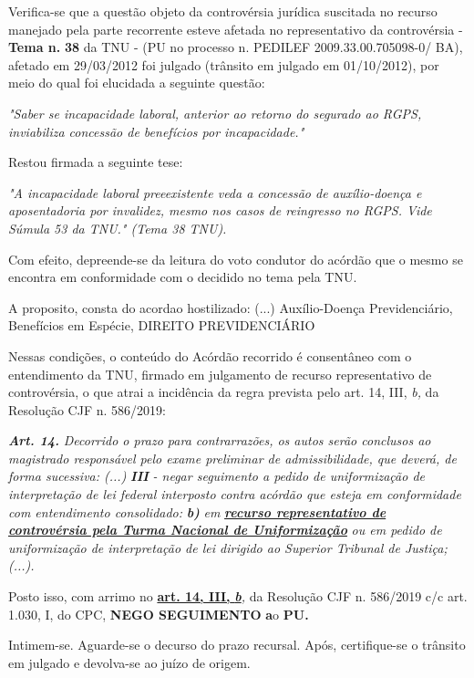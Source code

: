 \documentclass[12pt]{article}
\begin{document}
\justifying
\noindent Verifica-se que a questão objeto da controvérsia jurídica suscitada no recurso manejado pela parte recorrente esteve afetada no representativo da controvérsia - \textbf{Tema n. }\textbf{38} da TNU - (PU no processo n. PEDILEF 2009.33.00.705098-0/ BA),  afetado em 29/03/2012 foi julgado (trânsito em julgado em 01/10/2012), por meio do qual foi elucidada a seguinte questão:

\noindent \textit{"Saber se incapacidade laboral, anterior ao retorno do segurado ao RGPS, inviabiliza concessão de benefícios por incapacidade."}

\noindent Restou firmada a seguinte tese:

\noindent \textit{"A incapacidade laboral preeexistente veda a concessão de auxílio-doença e aposentadoria por invalidez, mesmo nos casos de reingresso no RGPS. Vide Súmula 53 da TNU." (Tema 38 TNU).}

\noindent Com efeito, depreende-se da leitura do voto condutor do acórdão que o mesmo se encontra em conformidade com o decidido no  tema pela TNU.

\noindent A proposito, consta do acordao hostilizado: (...) Auxílio-Doença Previdenciário, Benefícios em Espécie, DIREITO PREVIDENCIÁRIO

\noindent Nessas condições, o conteúdo do Acórdão recorrido é consentâneo com o entendimento da TNU, firmado em julgamento de recurso representativo de controvérsia, o que atrai a incidência da regra prevista pelo art. 14, III, \textit{b,} da Resolução CJF n. 586/2019:

\noindent \textit{\textbf{Art. 14.}}\textit{ Decorrido o prazo para contrarrazões, os autos serão conclusos ao magistrado responsável pelo exame preliminar de admissibilidade, que deverá, de forma sucessiva: (...) }\textit{\textbf{III }}\textit{- negar seguimento a pedido de uniformização de interpretação de lei federal interposto contra acórdão que esteja em conformidade com entendimento consolidado: }\textit{\textbf{b)}}\textit{ em }\uline{\textit{\textbf{recurso representativo de controvérsia pela Turma Nacional de Uniformização}}}\textit{ ou em pedido de uniformização de interpretação de lei dirigido ao Superior Tribunal de Justiça;(...).}

\noindent Posto isso, com arrimo no \uline{\textbf{art. 14, III, }}\uline{\textit{\textbf{b}}}\textit{,} da Resolução CJF n. 586/2019 c/c art. 1.030, I, do CPC, \textbf{NEGO SEGUIMENTO }\textbf{a}o\textbf{ PU}\textbf{.}

\noindent Intimem-se. Aguarde-se o decurso do prazo recursal. Após, certifique-se o trânsito em julgado e devolva-se ao juízo de origem.
\end{document}
